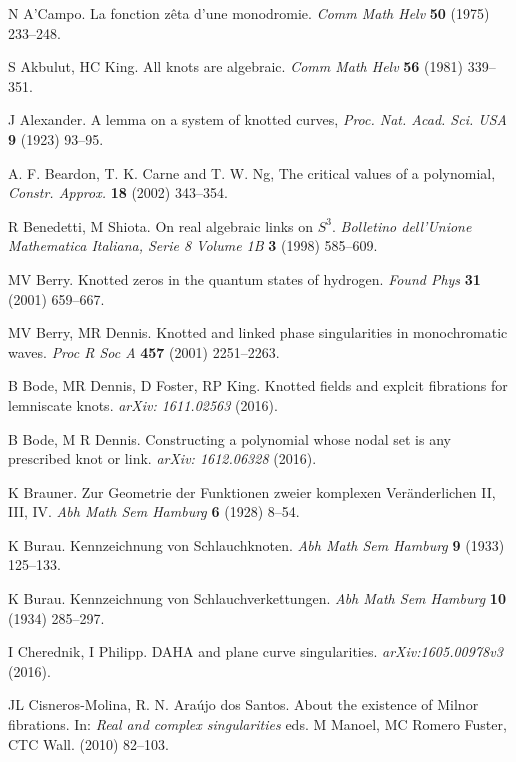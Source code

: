 \documentclass[notitlepage,12pt]{revtex4-1}
\begin{document}
\begin{thebibliography}{99}

 N A'Campo. La fonction z{\^e}ta d'une monodromie. \textit{Comm Math Helv} \textbf{50} (1975) 233--248.

 S Akbulut, HC King.  All knots are algebraic. \textit{Comm Math Helv} \textbf{56} (1981) 339--351.

 J Alexander. A lemma on a system of knotted curves, {\it Proc. Nat. Acad. Sci. USA} {\bf 9} (1923) 93--95.

 A. F. Beardon, T. K. Carne and T. W. Ng, The critical values of a polynomial, {\it Constr. Approx.} {\bf 18} (2002) 343--354.

 R Benedetti, M Shiota. On real algebraic links on $S^3$. \textit{Bolletino dell'Unione Mathematica Italiana, Serie 8 Volume 1B} \textbf{3} (1998) 585--609.

 MV Berry. Knotted zeros in the quantum states of hydrogen. \textit{Found Phys} \textbf{31} (2001) 659--667.

 MV Berry, MR Dennis. Knotted and linked phase singularities in monochromatic waves. \textit{Proc R Soc A} \textbf{457} (2001) 2251--2263.

 B Bode, MR Dennis, D Foster, RP King. Knotted fields and explcit fibrations for lemniscate knots. \textit{arXiv: 1611.02563} (2016).

 B Bode, M R Dennis. Constructing a polynomial whose nodal set is any prescribed knot or link. \textit{arXiv: 1612.06328} (2016).

 K Brauner. Zur Geometrie der Funktionen zweier komplexen Ver{\"a}nderlichen II, III, IV. \textit{Abh Math Sem Hamburg} \textbf{6} (1928) 8--54.

 K Burau. Kennzeichnung von Schlauchknoten. \textit{Abh Math Sem Hamburg} \textbf{9} (1933) 125--133.

 K Burau. Kennzeichnung von Schlauchverkettungen. \textit{Abh Math Sem Hamburg} \textbf{10} (1934) 285--297.

 I Cherednik, I Philipp. DAHA and plane curve singularities. \textit{arXiv:1605.00978v3} (2016).

 JL Cisneros-Molina, R. N. Ara{\'u}jo dos Santos. About the existence of Milnor fibrations. In: \textit{Real and complex singularities} eds. M Manoel, MC Romero Fuster, CTC Wall. (2010) 82--103.


\end{thebibliography}
\end{document}
